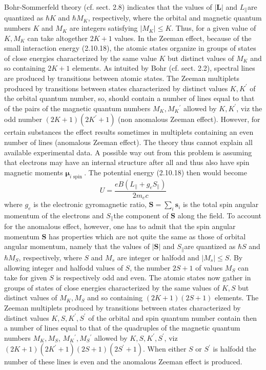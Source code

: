 \documentclass{article}
\begin{document}
Bohr-Sommerfeld theory (cf. sect. 2.8) indicates that the values of $|\boldsymbol{L}|$ and $L_{\|}$are quantized as $\hbar K$ and $\hbar M_{K}$, respectively, where the orbital and magnetic quantum numbers $K$ and $M_{K}$ are integers satisfying $\left|M_{K}\right| \leq K$. Thus, for a given value of $K, M_{K}$ can take altogether $2 K+1$ values. In the Zeeman effect, because of the small interaction energy (2.10.18), the atomic states organize in groups of states of close energies characterized by the same value $K$ but distinct values of $M_{K}$ and so containing $2 K+1$ elements. As intuited by Bohr (cf. sect. 2.2), spectral lines are produced by transitions between atomic states. The Zeeman multiplets produced by transitions between states characterized by distinct values $K, K^{\prime}$ of the orbital quantum number, so, should contain a number of lines equal to that of the pairs of the magnetic quantum numbers $M_{K}, M_{K}{ }^{\prime}$ allowed by $K, K^{\prime}$, viz the odd number $(2 K+1)\left(2 K^{\prime}+1\right)$ (non anomalous Zeeman effect). However, for certain substances the effect results sometimes in multiplets containing an even number of lines (anomalous Zeeman effect). The theory thus cannot explain all available experimental data. A possible way out from this problem is assuming that electrons may have an internal structure after all and thus also have spin magnetic moments $\boldsymbol{\mu}_{i \text { spin }}$. The potential energy (2.10.18) then would become
$$
\begin{equation*}
U=\frac{e B\left(L_{\|}+g_{e} S_{\|}\right)}{2 m_{e} c} \tag{2.10.19}
\end{equation*}
$$
where $g_{e}$ is the electronic gyromagnetic ratio, $\boldsymbol{S}=\sum_{i} \boldsymbol{s}_{i}$ is the total spin angular momentum of the electrons and $S_{\|}$the component of $\boldsymbol{S}$ along the field. To account for the anomalous effect, however, one has to admit that the spin angular momentum $\boldsymbol{S}$ has properties which are not quite the same as those of orbital angular momentum, namely that the values of $|\boldsymbol{S}|$ and $S_{\|}$are quantized as $\hbar S$
and $\hbar M_{S}$, respectively, where $S$ and $M_{s}$ are integer or halfodd and $\left|M_{s}\right| \leq S$. By allowing integer and halfodd values of $S$, the number $2 S+1$ of values $M_{S}$ can take for given $S$ is respectively odd and even. The atomic states now gather in groups of states of close energies characterized by the same values of $K, S$ but distinct values of $M_{K}, M_{S}$ and so containing $(2 K+1)(2 S+1)$ elements. The Zeeman multiplets produced by transitions between states characterized by distinct values $K, S, K^{\prime}, S^{\prime}$ of the orbital and spin quantum number contain then a number of lines equal to that of the quadruples of the magnetic quantum numbers $M_{K}, M_{S}$, $M_{K}{ }^{\prime}, M_{S}{ }^{\prime}$ allowed by $K, S, K^{\prime}, S^{\prime}$, viz $(2 K+1)\left(2 K^{\prime}+1\right)(2 S+1)\left(2 S^{\prime}+1\right)$. When either $S$ or $S^{\prime}$ is halfodd the number of these lines is even and the anomalous Zeeman effect is produced.
\end{document}
